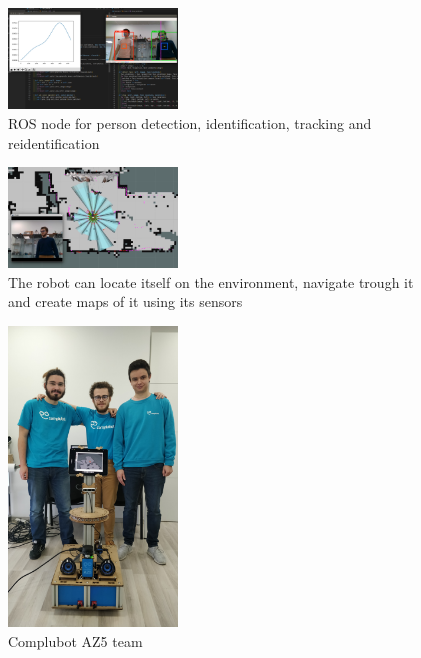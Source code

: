 \begin{center}
  \setlength\intextsep{0pt}
  \begin{figure}
    \centering
    \includegraphics[width=0.4\textwidth]{images/rviz_persosns.png}
    \caption{ROS node for person detection, identification, tracking and reidentification}
    \label{fig:rviz_persosns}
  \end{figure}

  \setlength\intextsep{0pt}
  \begin{figure}
    \centering
    \includegraphics[width=0.4\textwidth]{images/rviz_sensors.png}
    \caption{The robot can locate itself on the environment, navigate trough it and create maps of it using its sensors}
    \label{fig:rviz_sensors}
  \end{figure}

  \setlength\intextsep{0pt}
  \begin{figure}
    \centering
    \includegraphics[width=0.4\textwidth]{images/the_team.jpg}
    \caption{Complubot AZ5 team}
    \label{fig:the_team}
  \end{figure}
\end{center}
